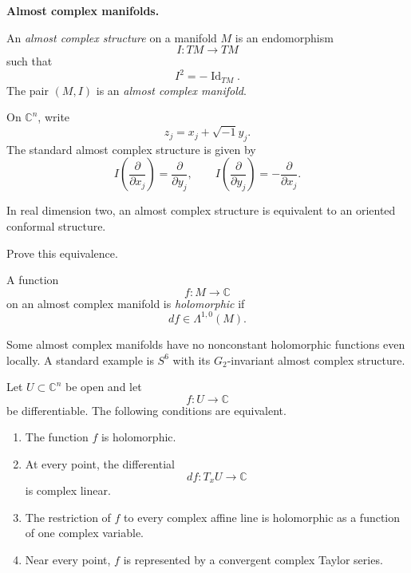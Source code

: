\medskip\noindent
{\bf Almost complex manifolds.}

\begin{definition}
\label{definition-almost-complex}
An {\it almost complex structure} on a
manifold $M$ is an endomorphism
$$
I:TM\longrightarrow TM
$$
such that
$$
I^2=-\operatorname{Id}_{TM}.
$$
The pair $(M,I)$ is an
{\it almost complex manifold}.
\end{definition}

On $\mathbb{C}^n$, write
$$
z_j=x_j+\sqrt{-1}y_j.
$$
The standard almost complex structure is
given by
$$
I\left(\frac{\partial}{\partial x_j}\right)
=\frac{\partial}{\partial y_j},
\qquad
I\left(\frac{\partial}{\partial y_j}\right)
=-\frac{\partial}{\partial x_j}.
$$

In real dimension two, an almost complex
structure is equivalent to an oriented
conformal structure.

\begin{exercise}
\label{exercise-almost-complex-conformal}
Prove this equivalence.
\end{exercise}

\begin{definition}
\label{definition-holomorphic-function-ac}
A function
$$
f:M\longrightarrow\mathbb{C}
$$
on an almost complex manifold is
{\it holomorphic} if
$$
df\in\Lambda^{1,0}(M).
$$
\end{definition}

Some almost complex manifolds have no
nonconstant holomorphic functions even
locally. A standard example is $S^6$ with
its $G_2$-invariant almost complex
structure.

\begin{theorem}
\label{theorem-holomorphic-equivalences}
Let $U\subset\mathbb{C}^n$ be open and let
$$
f:U\longrightarrow\mathbb{C}
$$
be differentiable. The following
conditions are equivalent.

\begin{enumerate}
\item The function $f$ is holomorphic.

\item At every point, the differential
$$
df:T_xU\longrightarrow\mathbb{C}
$$
is complex linear.

\item The restriction of $f$ to every
complex affine line is holomorphic as a
function of one complex variable.

\item Near every point, $f$ is represented
by a convergent complex Taylor series.
\end{enumerate}
\end{theorem}

